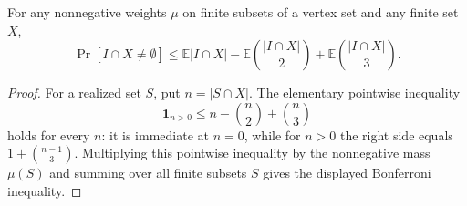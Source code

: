 \begin{lemma}
For any nonnegative weights $\mu$ on finite subsets of a vertex set and any
finite set $X$,
\[
\Pr[I\cap X\ne\emptyset]
\le
\mathbb E|I\cap X|
-\mathbb E\binom{|I\cap X|}{2}
+\mathbb E\binom{|I\cap X|}{3}.
\]
\end{lemma}
\begin{proof}
For a realized set $S$, put $n=|S\cap X|$.  The elementary pointwise
inequality
\[
\mathbf 1_{n>0}\le n-\binom n2+\binom n3
\]
holds for every $n$: it is immediate at $n=0$, while for $n>0$ the right
side equals $1+\binom{n-1}{3}$.  Multiplying this pointwise inequality by the
nonnegative mass $\mu(S)$ and summing over all finite subsets $S$ gives the
displayed Bonferroni inequality.
\end{proof}
